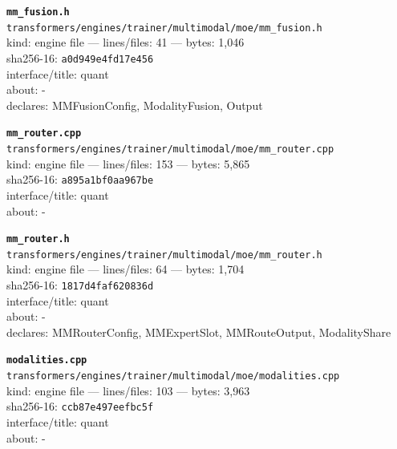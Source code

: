 \noindent\textbf{\texttt{mm\_fusion.h}}\\
\texttt{transformers/engines/trainer/multimodal/moe/mm\_fusion.h}\\
kind: engine file --- lines/files: 41 --- bytes: 1,046\\
sha256-16: \texttt{a0d949e4fd17e456}\\
interface/title: quant\\
about: -\\
declares: MMFusionConfig, ModalityFusion, Output\\
\vspace*{6.0pt}
\newpage

\noindent\textbf{\texttt{mm\_router.cpp}}\\
\texttt{transformers/engines/trainer/multimodal/moe/mm\_router.cpp}\\
kind: engine file --- lines/files: 153 --- bytes: 5,865\\
sha256-16: \texttt{a895a1bf0aa967be}\\
interface/title: quant\\
about: -\\
\vspace*{6.0pt}

\noindent\textbf{\texttt{mm\_router.h}}\\
\texttt{transformers/engines/trainer/multimodal/moe/mm\_router.h}\\
kind: engine file --- lines/files: 64 --- bytes: 1,704\\
sha256-16: \texttt{1817d4faf620836d}\\
interface/title: quant\\
about: -\\
declares: MMRouterConfig, MMExpertSlot, MMRouteOutput, ModalityShare\\
\vspace*{6.0pt}

\noindent\textbf{\texttt{modalities.cpp}}\\
\texttt{transformers/engines/trainer/multimodal/moe/modalities.cpp}\\
kind: engine file --- lines/files: 103 --- bytes: 3,963\\
sha256-16: \texttt{ccb87e497eefbc5f}\\
interface/title: quant\\
about: -\\
\vspace*{6.0pt}


